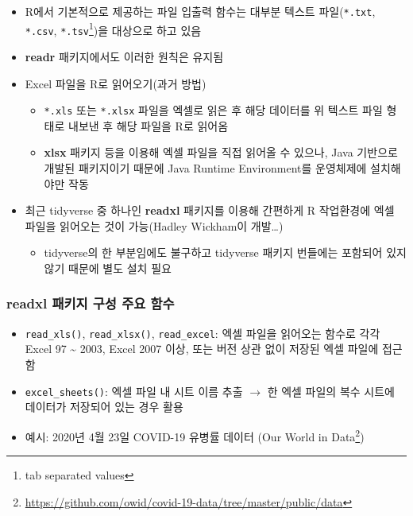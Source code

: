\documentclass[
  11pt,
]{krantz}
\providecommand{\tightlist}{%
  \setlength{\itemsep}{0pt}\setlength{\parskip}{0pt}}
\renewcommand{\href}[2]{#2\footnote{\url{#1}}}
\begin{document}
\begin{itemize}
\tightlist
\item
  R에서 기본적으로 제공하는 파일 입출력 함수는 대부분 텍스트 파일(\texttt{*.txt}, \texttt{*.csv}, \texttt{*.tsv}\footnote{tab separated values})을 대상으로 하고 있음
\item
  \textbf{readr} 패키지에서도 이러한 원칙은 유지됨
\item
  Excel 파일을 R로 읽어오기(과거 방법)

  \begin{itemize}
  \tightlist
  \item
    \texttt{*.xls} 또는 \texttt{*.xlsx} 파일을 엑셀로 읽은 후 해당 데이터를 위 텍스트 파일 형태로 내보낸 후 해당 파일을 R로 읽어옴
  \item
    \textbf{xlsx} 패키지 등을 이용해 엑셀 파일을 직접 읽어올 수 있으나, Java 기반으로 개발된 패키지이기 때문에 Java Runtime Environment를 운영체제에 설치해야만 작동
  \end{itemize}
\item
  최근 tidyverse 중 하나인 \textbf{readxl} 패키지를 이용해 간편하게 R 작업환경에 엑셀 파일을 읽어오는 것이 가능(Hadley Wickham이 개발\ldots)

  \begin{itemize}
  \tightlist
  \item
    tidyverse의 한 부분임에도 불구하고 tidyverse 패키지 번들에는 포함되어 있지 않기 때문에 별도 설치 필요
  \end{itemize}
\end{itemize}

\hypertarget{readxl-funs}{%
\subsubsection*{\texorpdfstring{\textbf{readxl} 패키지 구성 주요 함수}{readxl 패키지 구성 주요 함수}}\label{readxl-funs}}


\begin{itemize}
\tightlist
\item
  \texttt{read\_xls()}, \texttt{read\_xlsx()}, \texttt{read\_excel}: 엑셀 파일을 읽어오는 함수로 각각 Excel 97 \textasciitilde{} 2003, Excel 2007 이상, 또는 버전 상관 없이 저장된 엑셀 파일에 접근함
\item
  \texttt{excel\_sheets()}: 엑셀 파일 내 시트 이름 추출 \(\rightarrow\) 한 엑셀 파일의 복수 시트에 데이터가 저장되어 있는 경우 활용
\item
  예시: 2020년 4월 23일 COVID-19 유병률 데이터 (\href{https://github.com/owid/covid-19-data/tree/master/public/data}{Our World in Data})
\end{itemize}
\end{document}
